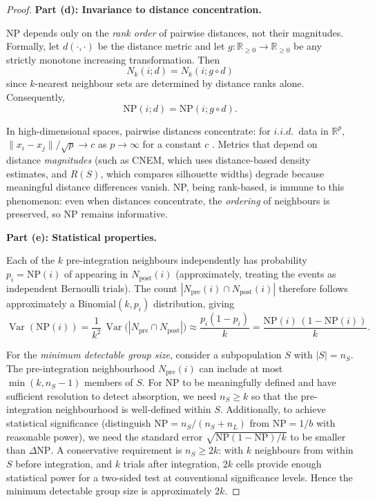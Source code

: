 \documentclass[11pt]{article}
\DeclareMathOperator{\Var}{Var}
\begin{document}
\begin{proof}
\medskip
\textbf{Part (d): Invariance to distance concentration.}

NP depends only on the \emph{rank order} of pairwise distances, not their
magnitudes.  Formally, let $d(\cdot,\cdot)$ be the distance metric and let
$g \colon \mathbb{R}_{\ge 0} \to \mathbb{R}_{\ge 0}$ be any strictly
monotone increasing transformation.  Then
\[
    N_k(i; d) = N_k(i; g \circ d)
\]
since $k$-nearest neighbour sets are determined by distance ranks alone.
Consequently,
\[
    \mathrm{NP}(i; d) = \mathrm{NP}(i; g \circ d).
\]

In high-dimensional spaces, pairwise distances concentrate: for $i.i.d.$\
data in $\mathbb{R}^p$,
$\|x_i - x_j\| / \sqrt{p} \to c$ as $p \to \infty$ for a constant $c$
\cite{beyer1999nearest}.  Metrics that depend on distance \emph{magnitudes}
(such as CNEM, which uses distance-based density estimates, and $R(S)$,
which compares silhouette widths) degrade because meaningful distance
differences vanish.  NP, being rank-based, is immune to this phenomenon:
even when distances concentrate, the \emph{ordering} of neighbours is
preserved, so NP remains informative.

\medskip
\textbf{Part (e): Statistical properties.}

Each of the $k$ pre-integration neighbours independently has probability
$p_i = \mathrm{NP}(i)$ of appearing in $N_{\mathrm{post}}(i)$
(approximately, treating the events as independent Bernoulli trials).
The count $|N_{\mathrm{pre}}(i) \cap N_{\mathrm{post}}(i)|$ therefore
follows approximately a $\mathrm{Binomial}(k, p_i)$ distribution, giving
\[
    \Var(\mathrm{NP}(i))
    = \frac{1}{k^2}\,\Var\bigl(|N_{\mathrm{pre}} \cap N_{\mathrm{post}}|\bigr)
    \approx \frac{p_i(1 - p_i)}{k}
    = \frac{\mathrm{NP}(i)\,(1 - \mathrm{NP}(i))}{k}.
\]

For the \emph{minimum detectable group size}, consider a subpopulation $S$
with $|S| = n_S$.  The pre-integration neighbourhood $N_{\mathrm{pre}}(i)$
can include at most $\min(k, n_S - 1)$ members of $S$.  For NP to be
meaningfully defined and have sufficient resolution to detect absorption,
we need $n_S \ge k$ so that the pre-integration neighbourhood is
well-defined within $S$.  Additionally, to achieve statistical significance
(distinguish $\mathrm{NP} = n_S/(n_S + n_L)$ from $\mathrm{NP} = 1/b$
with reasonable power), we need the standard error
$\sqrt{\mathrm{NP}(1-\mathrm{NP})/k}$ to be smaller than
$\Delta\mathrm{NP}$.  A conservative requirement is $n_S \ge 2k$: with $k$
neighbours from within $S$ before integration, and $k$ trials after
integration, $2k$ cells provide enough statistical power for a two-sided
test at conventional significance levels.  Hence the minimum detectable
group size is approximately $2k$.
\end{proof}
\end{document}
